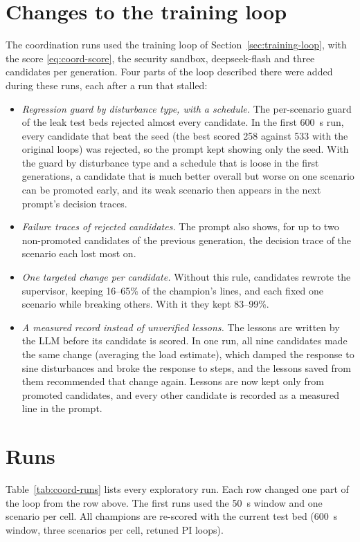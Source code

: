 \section{Changes to the training loop}
\label{sec:coord-loop}
The coordination runs used the training loop of
Section~\ref{sec:training-loop}, with the score \eqref{eq:coord-score}, the
security sandbox, deepseek-flash and three candidates per generation. Four
parts of the loop described there were added during these runs, each after a
run that stalled:
\begin{itemize}
\item \emph{Regression guard by disturbance type, with a schedule.} The
  per-scenario guard of the leak test beds rejected almost every candidate.
  In the first 600~s run, every candidate that beat the seed (the best scored
  258 against 533 with the original loops) was rejected, so the prompt kept
  showing only the seed. With the guard by disturbance type and a schedule
  that is loose in the first generations, a candidate that is much better
  overall but worse on one scenario can be promoted early, and its weak
  scenario then appears in the next prompt's decision traces.
\item \emph{Failure traces of rejected candidates.} The prompt also shows,
  for up to two non-promoted candidates of the previous generation, the
  decision trace of the scenario each lost most on.
\item \emph{One targeted change per candidate.} Without this rule,
  candidates rewrote the supervisor, keeping 16--65\% of the champion's lines,
  and each fixed one scenario while breaking others. With it they kept
  83--99\%.
\item \emph{A measured record instead of unverified lessons.} The lessons are
  written by the LLM before its candidate is scored. In one run, all nine
  candidates made the same change (averaging the load estimate), which damped
  the response to sine disturbances and broke the response to steps, and the
  lessons saved from them recommended that change again. Lessons are now kept
  only from promoted candidates, and every other candidate is recorded as a
  measured line in the prompt.
\end{itemize}

\section{Runs}
\label{sec:coord-runs}
Table~\ref{tab:coord-runs} lists every exploratory run. Each row changed one
part of the loop from the row above. The first runs used the 50~s window and
one scenario per cell. All champions are re-scored with the current test bed
(600~s window, three scenarios per cell, retuned PI loops).

